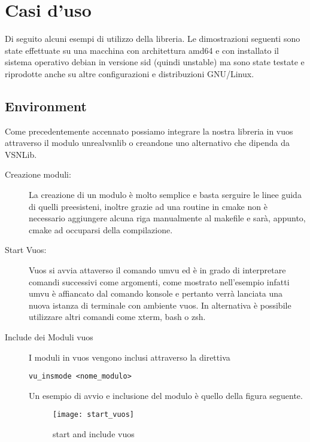 

\chapter{Casi d'uso}                %
\lhead[\fancyplain{}{\bfseries\thepage}]{\fancyplain{}{\bfseries\rightmark}}
Di seguito alcuni esempi di utilizzo della libreria.
Le dimostrazioni seguenti sono state effettuate su una macchina con architettura amd64 e con installato il sistema operativo debian in versione sid (quindi unstable) ma sono state testate e riprodotte anche su altre configurazioni e distribuzioni GNU/Linux.
\section{Environment}
Come precedentemente accennato possiamo integrare la nostra libreria in vuos attraverso il modulo unrealvsnlib o creandone uno alternativo che dipenda da VSNLib.\\
\begin{description}
\item[Creazione moduli:] La creazione di un modulo \`e molto semplice e basta serguire le linee guida di quelli preesisteni, inoltre grazie ad una routine in cmake non \`e necessario aggiungere alcuna riga manualmente al makefile e sar\`a, appunto, cmake ad occuparsi della compilazione.
\item[Start Vuos:] Vuos si avvia attaverso il comando umvu ed \`e in grado di interpretare comandi successivi come argomenti, come mostrato nell'esempio infatti umvu \`e affiancato dal comando konsole e pertanto verr\`a lanciata una nuova istanza di terminale con ambiente vuos.
In alternativa \`e possibile utilizzare altri comandi come xterm, bash o zsh.
\item[Include dei Moduli vuos] I moduli in vuos vengono inclusi attraverso la direttiva
\begin{verbatim}
vu_insmode <nome_modulo>
\end{verbatim}
Un esempio di avvio e inclusione del modulo \`e quello della figura seguente.
\begin{figure}[h]                       %
\begin{center}                          %
\texttt{[image: start\_vuos]}%
%
\caption[start/include\_mod vuos]{start and include vuos}\label{fig:start_vuos}
\end{center}
\end{figure}
\end{description}
